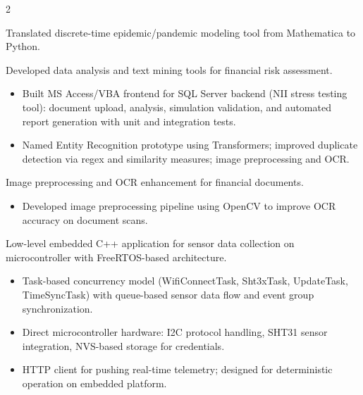 \documentclass[10pt,a4paper,ragged2e,withhyper]{altacv}
\begin{document}
\begin{paracol}{2}
\par\divider


Translated discrete-time epidemic/pandemic modeling tool from Mathematica to Python.

\par\divider


Developed data analysis and text mining tools for financial risk assessment.

\begin{itemize}
\item Built MS Access/VBA frontend for SQL Server backend (NII stress testing tool): document upload, analysis, simulation validation, and automated report generation with unit and integration tests.
\item Named Entity Recognition prototype using Transformers; improved duplicate detection via regex and similarity measures; image preprocessing and OCR.
\end{itemize}

\par\divider


Image preprocessing and OCR enhancement for financial documents.

\begin{itemize}
\item Developed image preprocessing pipeline using OpenCV to improve OCR accuracy on document scans.
\end{itemize}


\bigskip
{}
\label{sec:org9e2ff70}

Low-level embedded C++ application for sensor data collection on microcontroller with FreeRTOS-based architecture.

\begin{itemize}
\item Task-based concurrency model (WifiConnectTask, Sht3xTask, UpdateTask, TimeSyncTask) with queue-based sensor data flow and event group synchronization.
\item Direct microcontroller hardware: I2C protocol handling, SHT31 sensor integration, NVS-based storage for credentials.
\item HTTP client for pushing real-time telemetry; designed for deterministic operation on embedded platform.
\end{itemize}


\end{paracol}
\end{document}
